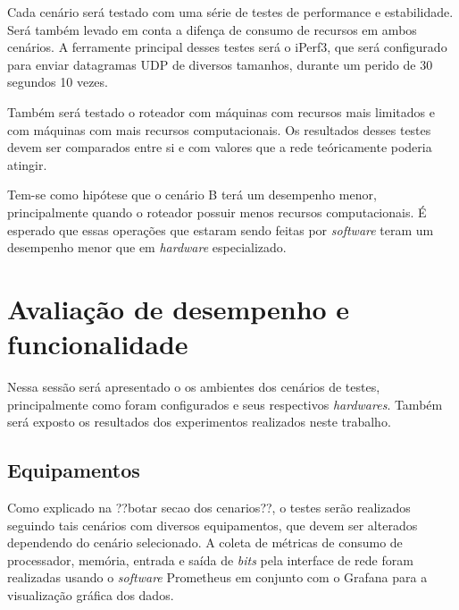 \documentclass[12pt]{article}
\begin{document}
Cada cenário será testado com uma série de testes de performance e estabilidade. Será também levado em conta a difença de consumo de recursos em ambos cenários. A ferramente principal desses testes será o iPerf3, que será configurado para enviar datagramas UDP de diversos tamanhos, durante um perido de 30 segundos 10 vezes.

Também será testado o roteador com máquinas com recursos mais limitados e com máquinas com mais recursos computacionais. Os resultados desses testes devem ser comparados entre si e com valores que a rede teóricamente poderia atingir.

Tem-se como hipótese que o cenário B terá um desempenho menor, principalmente quando o roteador possuir menos recursos computacionais. É esperado que essas operações que estaram sendo feitas por \textit{software} teram um desempenho menor que em \textit{hardware} especializado.


\section{Avaliação de desempenho e funcionalidade}
Nessa sessão será apresentado o os ambientes dos cenários de testes, principalmente como foram configurados e seus respectivos \textit{hardwares}. Também será exposto os resultados dos experimentos realizados neste trabalho.
\subsection{Equipamentos}
Como explicado na ??botar secao dos cenarios??, o testes serão realizados seguindo tais cenários com diversos equipamentos, que devem ser alterados dependendo do cenário selecionado.
A coleta de métricas de consumo de processador, memória, entrada e saída de \textit{bits} pela interface de rede
foram realizadas usando o \textit{software} Prometheus em conjunto com o Grafana para a visualização gráfica dos dados.

\end{document}
